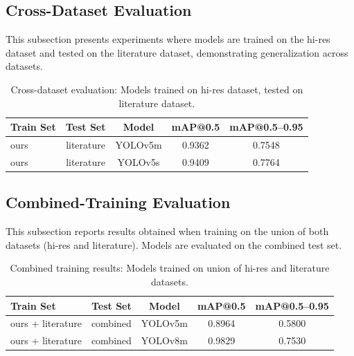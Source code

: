 
\subsection{Cross-Dataset Evaluation}

This subsection presents experiments where models are trained on the hi-res dataset 
and tested on the literature dataset, demonstrating generalization across datasets.

\begin{table}[h!]
\centering
\caption{Cross-dataset evaluation: Models trained on hi-res dataset, tested on literature dataset.}
\label{tab:crossdataset}
\begin{tabular}{lcccc}
\hline
Train Set & Test Set & Model & mAP@0.5 & mAP@0.5--0.95 \\
\hline
ours & literature & YOLOv5m & 0.9362 & 0.7548 \\
ours & literature & YOLOv5s & 0.9409 & 0.7764 \\
\hline
\end{tabular}
\end{table}


\subsection{Combined-Training Evaluation}

This subsection reports results obtained when training on the union of both datasets 
(hi-res and literature). Models are evaluated on the combined test set.

\begin{table}[h!]
\centering
\caption{Combined training results: Models trained on union of hi-res and literature datasets.}
\label{tab:combined}
\begin{tabular}{lcccc}
\hline
Train Set & Test Set & Model & mAP@0.5 & mAP@0.5--0.95 \\
\hline
ours + literature & combined & YOLOv5m & 0.8964 & 0.5800 \\
ours + literature & combined & YOLOv8m & 0.9829 & 0.7530 \\
\hline
\end{tabular}
\end{table}
